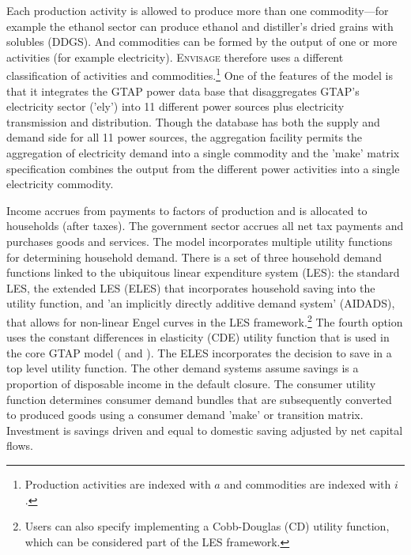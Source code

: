 \documentclass[11pt,letterpaper]{report}
\begin{document}
Each production activity is allowed to produce more than one commodity---for
example the ethanol sector can produce ethanol and distiller's dried grains with
solubles (DDGS). And commodities can be formed by the output of one or more
activities (for example electricity). \textsc{Envisage} therefore uses a
different classification of activities and commodities.\footnote{Production
activities are indexed with $a$ and commodities are indexed with $i$.} One of
the features of the model is that it integrates the GTAP power data base
that disaggregates GTAP's electricity sector ('ely') into 11 different power
sources plus electricity transmission and distribution. Though the database has
both the supply and demand side for all 11 power sources, the aggregation
facility permits the aggregation of electricity demand into a single commodity
and the 'make' matrix specification combines the output from the different power
activities into a single electricity commodity.

Income accrues from payments to factors of production and is allocated to
households (after taxes). The government sector accrues all net tax payments and
purchases goods and services. The model incorporates multiple utility functions
for determining household demand. There is a set of three household demand
functions linked to the ubiquitous linear expenditure system (LES): the standard
LES, the extended LES (ELES) that incorporates household saving into the utility
function, and 'an implicitly directly additive demand system' (AIDADS), that
allows for non-linear Engel curves in the LES framework.\footnote{Users can also
specify implementing a Cobb-Douglas (CD) utility function, which can be
considered part of the LES framework.}  The fourth option uses the constant
differences in elasticity (CDE) utility function that is used in the core
GTAP model (\cite{Hertel1997} and \cite{CorongetalJGEA2017}). The ELES
incorporates the decision to save in a top level utility function. The other
demand systems assume savings is a proportion of disposable income in
the default closure. The consumer utility function determines consumer demand
bundles that are subsequently converted to produced goods using a consumer
demand 'make' or transition matrix. Investment is savings driven and equal to
domestic saving adjusted by net capital flows.
\end{document}
